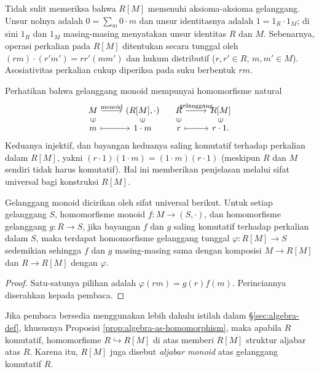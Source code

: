 Tidak sulit memeriksa bahwa $R[M]$ memenuhi aksioma-aksioma gelanggang. Unsur nolnya adalah $0 = \sum_m 0 \cdot m$ dan unsur identitasnya adalah $1 = 1_R \cdot 1_M$; di sini $1_R$ dan $1_M$ masing-masing menyatakan unsur identitas $R$ dan $M$. Sebenarnya, operasi perkalian pada $R[M]$ ditentukan secara tunggal oleh $(rm) \cdot (r'm') = rr' (mm')$ dan hukum distributif ($r,r' \in R$, $m, m' \in M$). Asosiativitas perkalian cukup diperiksa pada suku berbentuk $rm$.

Perhatikan bahwa gelanggang monoid mempunyai homomorfisme natural
\[\begin{tikzcd}[row sep=tiny]
	M \arrow[r, "\text{monoid}"] & (R[M], \cdot) \\
	m \arrow[mapsto, r] \arrow[phantom, u, sloped, "\in" description] & 1 \cdot m \arrow[phantom, u, sloped, "\in" description]
\end{tikzcd} \quad
\begin{tikzcd}[row sep=tiny]
	R \arrow[r, "\text{gelanggang}"] & R[M] \\
	r \arrow[mapsto, r] \arrow[phantom, u, sloped, "\in" description] & r \cdot 1. \arrow[phantom, u, sloped, "\in" description]
\end{tikzcd}\]
Keduanya injektif, dan bayangan keduanya saling komutatif terhadap perkalian dalam $R[M]$, yakni $(r \cdot 1)(1 \cdot m) = (1 \cdot m)(r \cdot 1)$ (meskipun $R$ dan $M$ sendiri tidak harus komutatif). Hal ini memberikan penjelasan melalui sifat universal bagi konstruksi $R[M]$.

\begin{proposition}\label{prop:monoid-ring-universal}
	Gelanggang monoid dicirikan oleh sifat universal berikut. Untuk setiap gelanggang $S$, homomorfisme monoid $f: M \to (S, \cdot)$, dan homomorfisme gelanggang $g: R \to S$, jika bayangan $f$ dan $g$ saling komutatif terhadap perkalian dalam $S$, maka terdapat homomorfisme gelanggang tunggal $\varphi: R[M] \to S$ sedemikian sehingga $f$ dan $g$ masing-masing sama dengan komposisi $M \to R[M]$ dan $R \to R[M]$ dengan $\varphi$.
\end{proposition}
\begin{proof}
	Satu-satunya pilihan adalah $\varphi(rm) = g(r)f(m)$. Perinciannya diserahkan kepada pembaca.
\end{proof}

Jika pembaca bersedia menggunakan lebih dahulu istilah dalam \S\ref{sec:algebra-def}, khususnya Proposisi \ref{prop:algebra-as-homomorphism}, maka apabila $R$ komutatif, homomorfisme $R \hookrightarrow R[M]$ di atas memberi $R[M]$ struktur aljabar atas $R$. Karena itu, $R[M]$ juga disebut \emph{aljabar monoid} atas gelanggang komutatif $R$.

